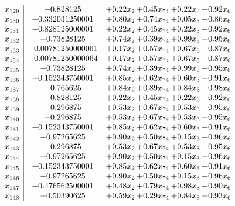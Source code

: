 \documentclass[8pt]{article}
\begin{document}
\[\begin{array}{c| c c@{\hskip 2pt} c@{\hskip 2pt} c@{\hskip 2pt} c@{\hskip 2pt} }
 x_{129}   &  -0.828125 & +  0.22 x_{2} & +  0.45 x_{74} & +  0.22 x_{3} & +  0.92 x_{6}\\
 x_{130}   &  -0.332031250001 & +  0.80 x_{2} & +  0.74 x_{74} & +  0.05 x_{3} & +  0.86 x_{6}\\
 x_{131}   &  -0.828125000001 & +  0.22 x_{2} & +  0.45 x_{74} & +  0.22 x_{3} & +  0.92 x_{6}\\
 x_{132}   &  -0.73828125 & +  0.74 x_{2} & +  0.39 x_{74} & +  0.99 x_{3} & +  0.95 x_{6}\\
 x_{133}   &  -0.00781250000061 & +  0.17 x_{2} & +  0.57 x_{74} & +  0.67 x_{3} & +  0.87 x_{6}\\
 x_{134}   &  -0.00781250000064 & +  0.17 x_{2} & +  0.57 x_{74} & +  0.67 x_{3} & +  0.87 x_{6}\\
 x_{135}   &  -0.73828125 & +  0.74 x_{2} & +  0.39 x_{74} & +  0.99 x_{3} & +  0.95 x_{6}\\
 x_{136}   &  -0.152343750001 & +  0.85 x_{2} & +  0.62 x_{74} & +  0.60 x_{3} & +  0.91 x_{6}\\
 x_{137}   &  -0.765625 & +  0.84 x_{2} & +  0.89 x_{74} & +  0.84 x_{3} & +  0.98 x_{6}\\
 x_{138}   &  -0.828125 & +  0.22 x_{2} & +  0.45 x_{74} & +  0.22 x_{3} & +  0.92 x_{6}\\
 x_{139}   &  -0.296875 & +  0.53 x_{2} & +  0.67 x_{74} & +  0.53 x_{3} & +  0.95 x_{6}\\
 x_{140}   &  -0.296875 & +  0.53 x_{2} & +  0.67 x_{74} & +  0.53 x_{3} & +  0.95 x_{6}\\
 x_{141}   &  -0.152343750001 & +  0.85 x_{2} & +  0.62 x_{74} & +  0.60 x_{3} & +  0.91 x_{6}\\
 x_{142}   &  -0.97265625 & +  0.90 x_{2} & +  0.50 x_{74} & +  0.15 x_{3} & +  0.96 x_{6}\\
 x_{143}   &  -0.296875 & +  0.53 x_{2} & +  0.67 x_{74} & +  0.53 x_{3} & +  0.95 x_{6}\\
 x_{144}   &  -0.97265625 & +  0.90 x_{2} & +  0.50 x_{74} & +  0.15 x_{3} & +  0.96 x_{6}\\
 x_{145}   &  -0.152343750001 & +  0.85 x_{2} & +  0.62 x_{74} & +  0.60 x_{3} & +  0.91 x_{6}\\
 x_{146}   &  -0.97265625 & +  0.90 x_{2} & +  0.50 x_{74} & +  0.15 x_{3} & +  0.96 x_{6}\\
 x_{147}   &  -0.476562500001 & +  0.48 x_{2} & +  0.79 x_{74} & +  0.98 x_{3} & +  0.90 x_{6}\\
 x_{148}   &  -0.50390625 & +  0.59 x_{2} & +  0.29 x_{74} & +  0.84 x_{3} & +  0.93 x_{6}\\

\end{array}\]
\end{document}
